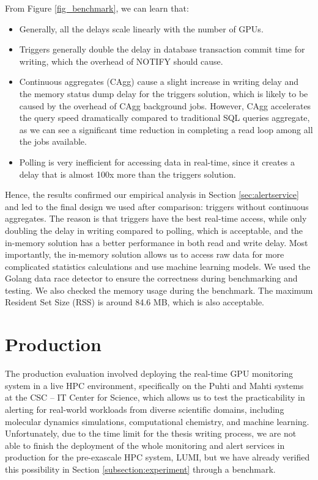 From Figure \ref{fig_benchmark}, we can learn that:

\begin{itemize}
    \item Generally, all the delays scale linearly with the number of GPUs.
    \item Triggers generally double the delay in database transaction commit time for writing, which the overhead of NOTIFY should cause.
    \item Continuous aggregates (CAgg) cause a slight increase in writing delay and the memory status dump delay for the triggers solution, which is likely to be caused by the overhead of CAgg background jobs. However, CAgg accelerates the query speed dramatically compared to traditional SQL queries aggregate, as we can see a significant time reduction in completing a read loop among all the jobs available.
    \item Polling is very inefficient for accessing data in real-time, since it creates a delay that is almost 100x more than the triggers solution.
\end{itemize}

Hence, the results confirmed our empirical analysis in Section \ref{sec:alertservice} and led to the final design we used after comparison: triggers without continuous aggregates. The reason is that triggers have the best real-time access, while only doubling the delay in writing compared to polling, which is acceptable, and the in-memory solution has a better performance in both read and write delay. Most importantly, the in-memory solution allows us to access raw data for more complicated statistics calculations and use machine learning models. We used the Golang data race detector to ensure the correctness during benchmarking and testing. We also checked the memory usage during the benchmark. The maximum Resident Set Size (RSS) is around 84.6 MB, which is also acceptable.


\section{Production}

The production evaluation involved deploying the real-time GPU monitoring system in a live HPC environment, specifically on the Puhti and Mahti systems at the CSC -- IT Center for Science, which allows us to test the practicability in alerting for real-world workloads from diverse scientific domains, including molecular dynamics simulations, computational chemistry, and machine learning. Unfortunately, due to the time limit for the thesis writing process, we are not able to finish the deployment of the whole monitoring and alert services in production for the pre-exascale HPC system, LUMI, but we have already verified this possibility in Section \ref{subsection:experiment} through a benchmark.

